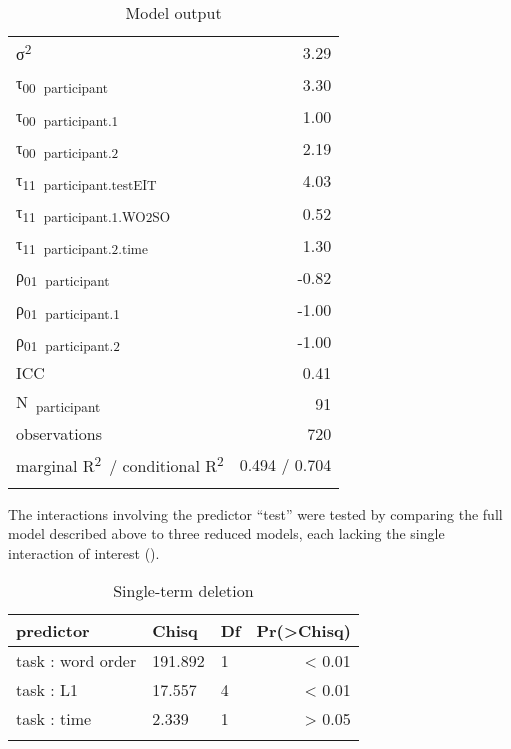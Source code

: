 \begin{table}
\begin{tabularx}{\textwidth}{Xrrr}
    σ\textsuperscript{2} & \multicolumn{3}{r}{3.29}\\
    τ\textsubscript{00}~\textsubscript{participant} & \multicolumn{3}{r}{3.30}\\
    τ\textsubscript{00}~\textsubscript{participant.1} & \multicolumn{3}{r}{1.00}\\
    τ\textsubscript{00}~\textsubscript{participant.2} & \multicolumn{3}{r}{2.19}\\
    τ\textsubscript{11}~\textsubscript{participant.testEIT} & \multicolumn{3}{r}{4.03}\\
    τ\textsubscript{11}~\textsubscript{participant.1.WO2SO} & \multicolumn{3}{r}{0.52}\\
    τ\textsubscript{11}~\textsubscript{participant.2.time} & \multicolumn{3}{r}{1.30}\\
    ρ\textsubscript{01}~\textsubscript{participant} & \multicolumn{3}{r}{{}-0.82}\\
    ρ\textsubscript{01}~\textsubscript{participant.1} & \multicolumn{3}{r}{{}-1.00}\\
    ρ\textsubscript{01}~\textsubscript{participant.2} & \multicolumn{3}{r}{{}-1.00}\\
    ICC & \multicolumn{3}{r}{0.41}\\
    N~\textsubscript{participant} & \multicolumn{3}{r}{91}\\
    observations & \multicolumn{3}{r}{720}\\
    marginal R\textsuperscript{2}~/ conditional R\textsuperscript{2} & \multicolumn{3}{r}{0.494 / 0.704}\\
    \lspbottomrule
    \end{tabularx}
    \caption{Model output}
    \label{tab:06:7}
\end{table}

The interactions involving the predictor “test” were tested by comparing the full model described above to three reduced models, each lacking the single interaction of interest ().

\begin{table}
    \begin{tabularx}{\textwidth}{XXXr}
    \lsptoprule
    predictor & Chisq & Df & Pr(>Chisq)\\
    \midrule
    task : word order & 191.892 & 1 & < 0.01\\
    task : L1 & 17.557 & 4 & < 0.01\\
    task : time & 2.339 & 1 & > 0.05\\
    \lspbottomrule
    \end{tabularx}
    \caption{Single-term deletion}
    \label{tab:06:8}
\end{table}

